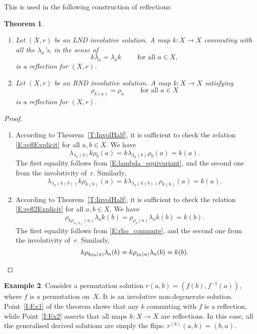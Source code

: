 \documentclass{amsart}
\theoremstyle{plain}
\newtheorem{thm}{Theorem}[section]
\theoremstyle{definition}
\newtheorem{exa}[thm]{Example}
\theoremstyle{remark}
\begin{document}
This is used in the following construction of reflections:

\begin{thm}\label{T:InvolExamples}
\begin{enumerate}
\item\label{I:Ex1} \cite{SVW18} Let $(X,r)$ be an LND involutive solution. A map $k \colon X \to X$ commuting with all the $\lambda_a$'s, in the sense of
\begin{equation}\label{E:lambda_equivariant}
k\lambda_a = \lambda_a k \qquad \text{ for all } a \in X,
\end{equation}
is a reflection for $(X,r)$.
\item\label{I:Ex2} Let $(X,r)$ be an RND involutive solution. A map $k \colon X \to X$ satisfying
\begin{equation}\label{E:rho_commute}
\rho_{k(a)}=\rho_a \qquad \text{ for all } a \in X
\end{equation}
is a reflection for $(X,r)$.
\end{enumerate}
\end{thm}

\begin{proof}
\begin{enumerate}
\item According to Theorem~\ref{T:InvolHalf}, it is sufficient to check the relation \eqref{E:reflExplicit} for all $a,b \in X$. We have
\[\lambda_{\lambda_a(b)}k\rho_b (a)=k\lambda_{\lambda_a(b)}\rho_b (a)=k(a).\]
The first equality follows from \eqref{E:lambda_equivariant}, and the second one from the involutivity of~$r$. Similarly,
\[\lambda_{\lambda_a(k(b))}k\rho_{k(b)} (a)=k\lambda_{\lambda_a(k(b))}\rho_{k(b)} (a)=k(a).\]
\item According to Theorem~\ref{T:InvolHalf}, it is sufficient to check the relation \eqref{E:refl2Explicit} for all $a,b \in X$. We have
\[ \rho_{k \rho_{k(b)}(a)}\lambda_ak(b)= \rho_{\rho_{b}(a)}\lambda_ak(b)=k(b).\]
The first equality follows from \eqref{E:rho_commute}, and the second one from the involutivity of~$r$. Similarly,
\[k\rho_{k \rho_b(a)}\lambda_a(b)=k\rho_{\rho_b(a)}\lambda_a(b)=k(b).\qedhere\] 
\end{enumerate}
\end{proof}

\begin{exa}\label{EX:Perm}
Consider a permutation solution $r(a,b)=(f(b),f^{-1}(a))$, where $f$ is a permutation on~$X$. It is an involutive non-degenerate solution. Point~\ref{I:Ex1} of the theorem shows that any $k$ commuting with $f$ is a reflection, while Point~\ref{I:Ex2} asserts that all maps $k \colon X \to X$ are reflections. In this case, all the generalised derived solutions are simply the flips: $r^{(k)}(a,b)=(b,a)$.
\end{exa}
\end{document}
